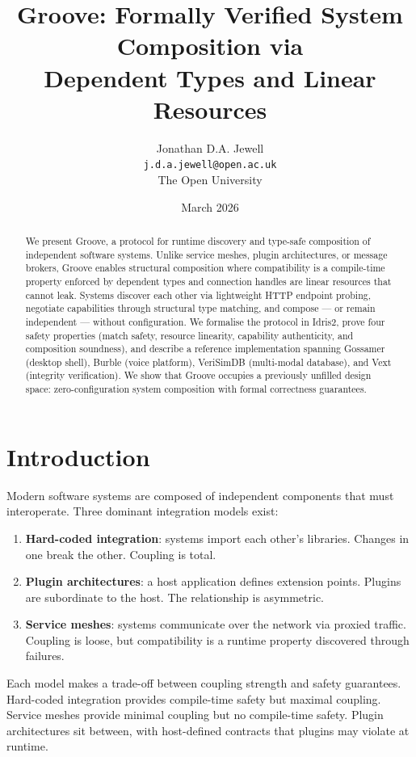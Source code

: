 \documentclass[11pt,a4paper]{article}
\title{Groove: Formally Verified System Composition via\\
Dependent Types and Linear Resources}
\author{Jonathan D.A. Jewell\\
\texttt{j.d.a.jewell@open.ac.uk}\\
The Open University}
\date{March 2026}
\begin{document}
\maketitle

\begin{abstract}
We present Groove, a protocol for runtime discovery and type-safe composition
of independent software systems. Unlike service meshes, plugin architectures,
or message brokers, Groove enables structural composition where compatibility
is a compile-time property enforced by dependent types and connection handles
are linear resources that cannot leak. Systems discover each other via
lightweight HTTP endpoint probing, negotiate capabilities through structural
type matching, and compose --- or remain independent --- without configuration.
We formalise the protocol in Idris2, prove four safety properties (match
safety, resource linearity, capability authenticity, and composition
soundness), and describe a reference implementation spanning Gossamer (desktop
shell), Burble (voice platform), VeriSimDB (multi-modal database), and Vext
(integrity verification). We show that Groove occupies a previously unfilled
design space: zero-configuration system composition with formal correctness
guarantees.
\end{abstract}

\section{Introduction}

Modern software systems are composed of independent components that must
interoperate. Three dominant integration models exist:

\begin{enumerate}
\item \textbf{Hard-coded integration}: systems import each other's libraries.
  Changes in one break the other. Coupling is total.
\item \textbf{Plugin architectures}: a host application defines extension
  points. Plugins are subordinate to the host. The relationship is
  asymmetric.
\item \textbf{Service meshes}: systems communicate over the network via
  proxied traffic. Coupling is loose, but compatibility is a runtime
  property discovered through failures.
\end{enumerate}

Each model makes a trade-off between coupling strength and safety guarantees.
Hard-coded integration provides compile-time safety but maximal coupling.
Service meshes provide minimal coupling but no compile-time safety. Plugin
architectures sit between, with host-defined contracts that plugins may
violate at runtime.
\end{document}
